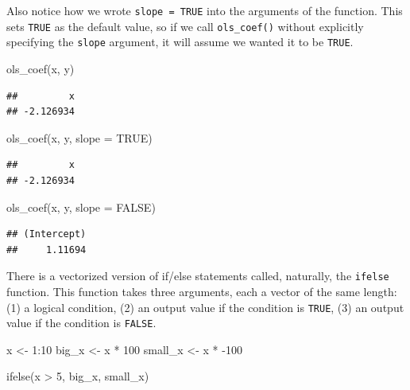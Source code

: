 \documentclass[
  12pt,
  oneside,openany]{book}
\newenvironment{Shaded}{\begin{snugshade}}{\end{snugshade}}
\newcommand{\AttributeTok}[1]{\textcolor[rgb]{0.77,0.63,0.00}{#1}}
\newcommand{\ConstantTok}[1]{\textcolor[rgb]{0.00,0.00,0.00}{#1}}
\newcommand{\DecValTok}[1]{\textcolor[rgb]{0.00,0.00,0.81}{#1}}
\newcommand{\FunctionTok}[1]{\textcolor[rgb]{0.00,0.00,0.00}{#1}}
\newcommand{\NormalTok}[1]{#1}
\newcommand{\OtherTok}[1]{\textcolor[rgb]{0.56,0.35,0.01}{#1}}
\newcommand{\SpecialCharTok}[1]{\textcolor[rgb]{0.00,0.00,0.00}{#1}}
\begin{document}
Also notice how we wrote \texttt{slope\ =\ TRUE} into the arguments of the function.
This sets \texttt{TRUE} as the default value, so if we call \texttt{ols\_coef()} without explicitly specifying the \texttt{slope} argument, it will assume we wanted it to be \texttt{TRUE}.

\begin{Shaded}
\begin{Highlighting}[]
\FunctionTok{ols\_coef}\NormalTok{(x, y)}
\end{Highlighting}
\end{Shaded}

\begin{verbatim}
##         x 
## -2.126934
\end{verbatim}

\begin{Shaded}
\begin{Highlighting}[]
\FunctionTok{ols\_coef}\NormalTok{(x, y, }\AttributeTok{slope =} \ConstantTok{TRUE}\NormalTok{)}
\end{Highlighting}
\end{Shaded}

\begin{verbatim}
##         x 
## -2.126934
\end{verbatim}

\begin{Shaded}
\begin{Highlighting}[]
\FunctionTok{ols\_coef}\NormalTok{(x, y, }\AttributeTok{slope =} \ConstantTok{FALSE}\NormalTok{)}
\end{Highlighting}
\end{Shaded}

\begin{verbatim}
## (Intercept) 
##     1.11694
\end{verbatim}

There is a vectorized version of if/else statements called, naturally, the \texttt{ifelse} function. This function takes three arguments, each a vector of the same length: (1) a logical condition, (2) an output value if the condition is \texttt{TRUE}, (3) an output value if the condition is \texttt{FALSE}.

\begin{Shaded}
\begin{Highlighting}[]
\NormalTok{x }\OtherTok{\textless{}{-}} \DecValTok{1}\SpecialCharTok{:}\DecValTok{10}
\NormalTok{big\_x }\OtherTok{\textless{}{-}}\NormalTok{ x }\SpecialCharTok{*} \DecValTok{100}
\NormalTok{small\_x }\OtherTok{\textless{}{-}}\NormalTok{ x }\SpecialCharTok{*} \SpecialCharTok{{-}}\DecValTok{100}

\FunctionTok{ifelse}\NormalTok{(x }\SpecialCharTok{\textgreater{}} \DecValTok{5}\NormalTok{, big\_x, small\_x)}
\end{Highlighting}
\end{Shaded}
\end{document}

